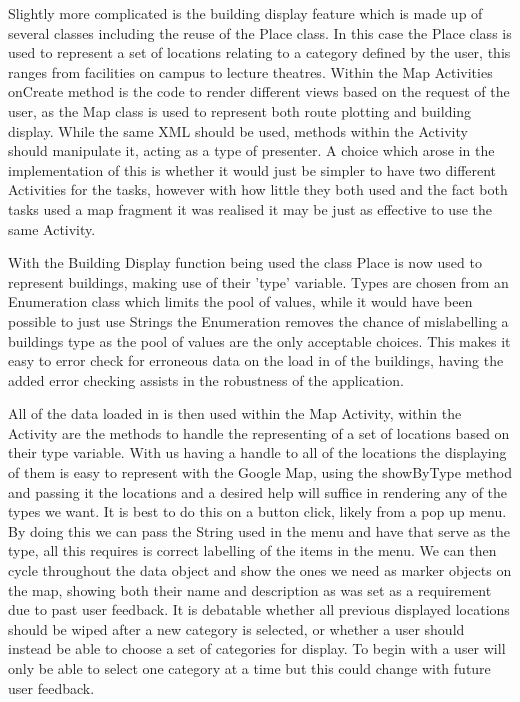 Slightly more complicated is the building display feature which is made up of several classes including the reuse of the Place class. In this case the Place class is used to represent a set of locations relating to a category defined by the user, this ranges from facilities on campus to lecture theatres. Within the Map Activities onCreate method is the code to render different views based on the request of the user, as the Map class is used to represent both route plotting and building display. While the same XML should be used, methods within the Activity should manipulate it, acting as a type of presenter. A choice which arose in the implementation of this is whether it would just be simpler to have two different Activities for the tasks, however with how little they both used and the fact both tasks used a map fragment it was realised it may be just as effective to use the same Activity. 

With the Building Display function being used the class Place is now used to represent buildings, making use of their 'type' variable. Types are chosen from an Enumeration class which limits the pool of values, while it would have been possible to just use Strings the Enumeration removes the chance of mislabelling a buildings type as the pool of values are the only acceptable choices. This makes it easy to error check for erroneous data on the load in of the buildings, having the added error checking assists in the robustness of the application. 

All of the data loaded in is then used within the Map Activity, within the Activity are the methods to handle the representing of a set of locations based on their type variable. With us having a handle to all of the locations the displaying of them is easy to represent with the Google Map, using the showByType method and passing it the locations and a desired help will suffice in rendering any of the types we want. It is best to do this on a button click, likely from a pop up menu. By doing this we can pass the String used in the menu and have that serve as the type, all this requires is correct labelling of the items in the menu. We can then cycle throughout the data object and show the ones we need as marker objects on the map, showing both their name and description as was set as a requirement due to past user feedback. It is debatable whether all previous displayed locations should be wiped after a new category is selected, or whether a user should instead be able to choose a set of categories for display. To begin with a user will only be able to select one category at a time but this could change with future user feedback. 

